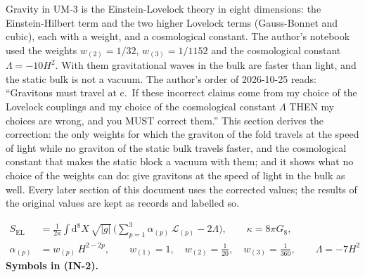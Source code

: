 \documentclass[
  10pt,
]{article}
\begin{document}
Gravity in UM-3 is the Einstein-Lovelock theory in eight dimensions: the
Einstein-Hilbert term and the two higher Lovelock terms (Gauss-Bonnet
and cubic), each with a weight, and a cosmological constant. The
author's notebook used the weights \(w_{(2)} = 1/32\),
\(w_{(3)} = 1/1152\) and the cosmological constant \(\Lambda = -10H^2\).
With them gravitational waves in the bulk are faster than light, and the
static bulk is not a vacuum. The author's order of 2026-10-25 reads:
``Gravitons must travel at c.~If these incorrect claims come from my
choice of the Lovelock couplings and my choice of the cosmological
constant \(\Lambda\) THEN my choices are wrong, and you MUST correct
them.'' This section derives the correction: the only weights for which
the graviton of the fold travels at the speed of light while no graviton
of the static bulk travels faster, and the cosmological constant that
makes the static block a vacuum with them; and it shows what no choice
of the weights can do: give gravitons at the speed of light in the bulk
as well. Every later section of this document uses the corrected values;
the results of the original values are kept as records and labelled so.

\[
\begin{aligned}
S_{\mathrm{EL}} &= \frac{1}{2\kappa}\int\mathrm{d}^8X\,\sqrt{\lvert g\rvert}\,\Big(\sum_{p=1}^{3}\alpha_{(p)}\,\mathcal{L}_{(p)}
 - 2\Lambda\Big),\qquad \kappa = 8\pi G_8,\\
\alpha_{(p)} &= w_{(p)}\,H^{2-2p},\qquad w_{(1)} = 1,\quad w_{(2)} = \frac{1}{20},\quad w_{(3)} = \frac{1}{360},
 \qquad \Lambda = -7H^2
\end{aligned} \tag{IN-2}
\] \textbf{Symbols in (IN-2).}
\end{document}
